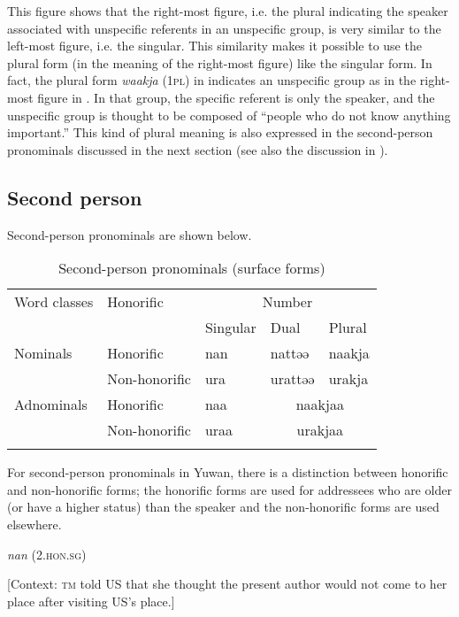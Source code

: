This figure shows that the right-most figure, i.e. the plural indicating the speaker associated with unspecific referents in an unspecific group, is very similar to the left-most figure, i.e. the singular. This similarity makes it possible to use the plural form (in the meaning of the right-most figure) like the singular form. In fact, the plural form \textit{waakja} (1\textsc{pl}) in  indicates an unspecific group as in the right-most figure in . In that group, the specific referent is only the speaker, and the unspecific group is thought to be composed of “people who do not know anything important.” This kind of plural meaning is also expressed in the second-person pronominals discussed in the next section (see also the discussion in ).

\subsection{Second person}

Second-person pronominals are shown below.

\begin{table}
\caption{\label{tab:key:34}Second-person pronominals (surface forms)}
\begin{tabular}{lllll}
\lsptoprule
Word classes  & Honorific & \multicolumn{3}{c}{Number}\\\cmidrule(lr){3-5}
              &           &    Singular & Dual & Plural\\\midrule
Nominals & Honorific & nan & nattəə & naakja\\
         & Non-honorific & ura & urattəə & urakja\\
Adnominals & Honorific & naa & \multicolumn{2}{c}{naakjaa}\\
           & Non-honorific & uraa & \multicolumn{2}{c}{urakjaa}\\
\lspbottomrule
\end{tabular}
\end{table}

For second-person pronominals in Yuwan, there is a distinction between honorific and non-honorific forms; the honorific forms are used for addressees who are older (or have a higher status) than the speaker and the non-honorific forms are used elsewhere.

\ea \label{ex:5:9}  \ea \label{ex:5:9a} \textit{nan} (2.\textsc{hon}.\textsc{sg})

    [Context: \textsc{tm} told US that she thought the present author would not come to her place after visiting US’s place.]

